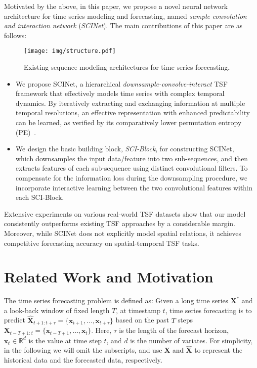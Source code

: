 \documentclass{article}
\begin{document}
Motivated by the above, in this paper, we propose a novel neural network architecture for time series modeling and forecasting, named \textit{sample convolution and interaction network} (\textit{SCINet}). The main contributions of this paper are as follows:  

\begin{figure*}[t]
    \centering
\texttt{[image: img/structure.pdf]}
    \caption{Existing sequence modeling architectures for time series forecasting.}
    \label{fig:related}
     \vspace{-5pt}
\end{figure*}




\begin{itemize}


\item We propose SCINet, a hierarchical \emph{downsample-convolve-interact} TSF framework that effectively models time series with complex temporal dynamics. By iteratively extracting and exchanging information at multiple temporal resolutions, an effective representation with enhanced predictability can be learned, as verified by its comparatively lower permutation entropy (PE)~\citep{Huang2019EnhancedTS}.
\vspace{5pt}
\item We design the basic building block, \textit{SCI-Block}, for constructing SCINet, which downsamples the input data/feature into two sub-sequences, and then extracts features of each sub-sequence using distinct convolutional filters. To compensate for the information loss during the downsampling procedure, we incorporate interactive learning between the two convolutional features within each SCI-Block.
\end{itemize}


Extensive experiments on various real-world TSF datasets show that our model consistently outperforms existing TSF approaches by a considerable margin. Moreover, while SCINet does not explicitly model spatial relations, it achieves competitive forecasting accuracy on spatial-temporal TSF tasks.   

\section{Related Work and Motivation}
\label{sec:related}
The time series forecasting problem is defined as: Given a long time series $\mathbf{X}^*$ and a look-back window of fixed length $T$, at timestamp $t$, 
time series forecasting is to predict $\hat{\mathbf{X}}_{t+1:t+\tau} = \{ \mathbf{x}_{t+1},..., \mathbf{x}_{t+ \tau} \}$ based on the past $T$ steps $\mathbf{X}_{t-T+1:t} = \{ \mathbf{x}_{t-T+1},..., \mathbf{x}_{t} \}$. Here, $\tau$ is the length of the forecast horizon, $\mathbf{x}_{t} \in \mathbb{R}^{d}$ is the value at time step $t$, and $d$ is the number of variates. 
For simplicity, in the following we will omit the subscripts, and use $\mathbf{X}$ and $\hat{\mathbf{X}}$ to represent the historical data and the forecasted data, respectively.
\end{document}
